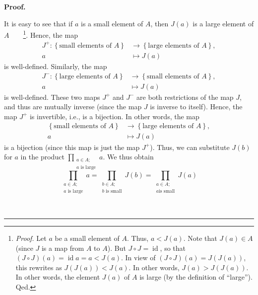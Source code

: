 \documentclass[numbers=enddot,12pt,final,onecolumn,notitlepage]{scrartcl}%
\numberwithin{exer}{subsection}
\theoremstyle{definition}
\newenvironment{fineprint}{\begin{small}}{\end{small}}
\newenvironment{proof}[1][Proof]{\noindent\textbf{#1.} }{\ \rule{0.5em}{0.5em}}
\let\prodnonlimits\prod
\renewcommand{\prod}{\prodnonlimits\limits}
\begin{document}
\begin{proof}
\begin{fineprint}
It is easy to see that if $a$ is a small element of $A$, then $J\left(
a\right)  $ is a large element of $A$\ \ \ \ \footnote{\textit{Proof.} Let $a$
be a small element of $A$. Thus, $a<J\left(  a\right)  $. Note that $J\left(
a\right)  \in A$ (since $J$ is a map from $A$ to $A$). But $J\circ
J=\operatorname{id}$, so that $\left(  J\circ J\right)  \left(  a\right)
=\operatorname{id}{a}=a<J\left(  a\right)  $. In view of $\left(  J\circ
J\right)  \left(  a\right)  =J\left(  J\left(  a\right)  \right)  $, this
rewrites as $J\left(  J\left(  a\right)  \right)  <J\left(  a\right)  $. In
other words, $J\left(  a\right)  > J\left(  J\left(  a\right)  \right)  $. In
other words, the element $J\left(  a\right)  $ of $A$ is large (by the
definition of \textquotedblleft large\textquotedblright). Qed.}. Hence, the
map%
\begin{align*}
J^{+}:\left\{  \text{small elements of }A\right\}   &  \rightarrow\left\{
\text{large elements of }A\right\}  ,\\
a  &  \mapsto J\left(  a\right)
\end{align*}
is well-defined. Similarly, the map%
\begin{align*}
J^{-}:\left\{  \text{large elements of }A\right\}   &  \rightarrow\left\{
\text{small elements of }A\right\}  ,\\
a  &  \mapsto J\left(  a\right)
\end{align*}
is well-defined. These two maps $J^{+}$ and $J^{-}$ are both restrictions of
the map $J$, and thus are mutually inverse (since the map $J$ is inverse to
itself). Hence, the map $J^{+}$ is invertible, i.e., is a bijection. In other
words, the map%
\begin{align*}
\left\{  \text{small elements of }A\right\}   &  \rightarrow\left\{
\text{large elements of }A\right\}  ,\\
a  &  \mapsto J\left(  a\right)
\end{align*}
is a bijection (since this map is just the map $J^{+}$). Thus, we can
substitute $J\left(  b\right)  $ for $a$ in the product $\prod_{\substack{a\in
A;\\a\text{ is large}}}a$. We thus obtain%
\begin{equation}
\prod_{\substack{a\in A;\\a\text{ is large}}}a=\prod_{\substack{b\in
A;\\b\text{ is small}}}J\left(  b\right)  =\prod_{\substack{a\in A;\\a\text{
is small}}}J\left(  a\right)  \label{pf.thm.ent.wilson.prodlar}%

\end{equation}
\end{fineprint}
\end{proof}
\end{document}
